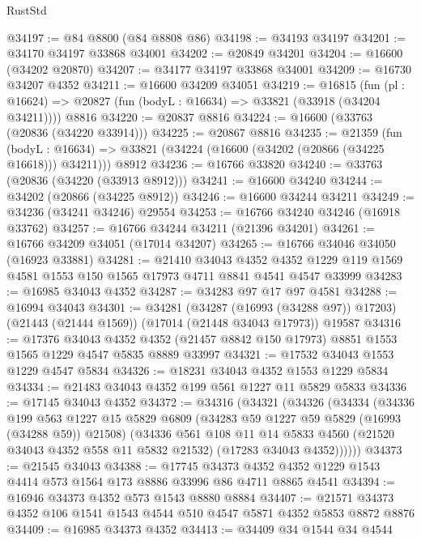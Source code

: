 \begin{lexlean}{RustStd}
\begin{coremodule}
{\begin{coremodule}
{{{{{{{{{{{{{{{{{{{{{{{{{{{{{{{{{{{{{{{{{{{{{{{{{{{{{{{@34197 := @84 @8800 (@84 @8808 @86)
@34198 := @34193 @34197
@34201 := @34170 @34197 @33868 @34001
@34202 := @20849 @34201
@34204 := @16600 (@34202 @20870)
@34207 := @34177 @34197 @33868 @34001
@34209 := @16730 @34207 @4352
@34211 := @16600 @34209 @34051
@34219 := @16815
    (fun (pl : @16624) => @20827 (fun (bodyL : @16634) => @33821 (@33918 (@34204 @34211))))
    @8816
@34220 := @20837 @8816
@34224 := @16600 (@33763 (@20836 (@34220 @33914)))
@34225 := @20867 @8816
@34235 := @21359
    (fun (bodyL : @16634) => @33821 (@34224 (@16600 (@34202 (@20866 (@34225 @16618))) @34211)))
    @8912
@34236 := @16766 @33820
@34240 := @33763 (@20836 (@34220 (@33913 @8912)))
@34241 := @16600 @34240
@34244 := @34202 (@20866 (@34225 @8912))
@34246 := @16600 @34244 @34211
@34249 := @34236 (@34241 @34246) @29554
@34253 := @16766 @34240 @34246 (@16918 @33762)
@34257 := @16766 @34244 @34211 (@21396 @34201)
@34261 := @16766 @34209 @34051 (@17014 @34207)
@34265 := @16766 @34046 @34050 (@16923 @33881)
@34281 := @21410
    @34043
    @4352
    @4352
    @1229
    @119
    @1569
    @4581
    @1553
    @150
    @1565
    @17973
    @4711
    @8841
    @4541
    @4547
    @33999
@34283 := @16985 @34043 @4352
@34287 := @34283 @97 @17 @97 @4581
@34288 := @16994 @34043
@34301 := @34281
    (@34287 (@16993 (@34288 @97)) @17203)
    (@21443 (@21444 @1569))
    (@17014 (@21448 @34043 @17973))
    @19587
@34316 := @17376
    @34043
    @4352
    @4352
    (@21457 @8842 @150 @17973)
    @8851
    @1553
    @1565
    @1229
    @4547
    @5835
    @8889
    @33997
@34321 := @17532 @34043 @1553 @1229 @4547 @5834
@34326 := @18231 @34043 @4352 @1553 @1229 @5834
@34334 := @21483 @34043 @4352 @199 @561 @1227 @11 @5829 @5833
@34336 := @17145 @34043 @4352
@34372 := @34316
    (@34321
      (@34326
        (@34334
          (@34336
            @199
            @563
            @1227
            @15
            @5829
            @6809
            (@34283 @59 @1227 @59 @5829 (@16993 (@34288 @59)) @21508)
            (@34336
              @561
              @108
              @11
              @14
              @5833
              @4560
              (@21520 @34043 @4352 @558 @11 @5832 @21532)
              (@17283 @34043 @4352))))))
@34373 := @21545 @34043
@34388 := @17745
    @34373
    @4352
    @4352
    @1229
    @1543
    @4414
    @573
    @1564
    @173
    @8886
    @33996
    @86
    @4711
    @8865
    @4541
@34394 := @16946 @34373 @4352 @573 @1543 @8880 @8884
@34407 := @21571 @34373 @4352 @106 @1541 @1543 @4544 @510 @4547 @5871 @4352 @5853 @8872 @8876
@34409 := @16985 @34373 @4352
@34413 := @34409 @34 @1544 @34 @4544
}}}}}}}}}}}}}}}}}}}}}}}}}}}}}}}}}}}}}}}}}}}}}}}}}}}}}}}
\end{coremodule}}
\end{coremodule}
\end{lexlean}
